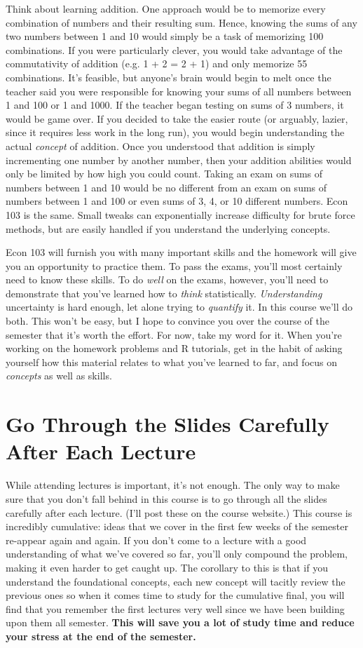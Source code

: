 \documentclass[12pt,letterpaper]{article}
\begin{document}
Think about learning addition. One approach would be to memorize every combination of numbers and their resulting sum. Hence, knowing the sums of any two numbers between 1 and 10 would simply be a task of memorizing 100 combinations. If you were particularly clever, you would take advantage of the commutativity of addition (e.g. 1 + 2 = 2 + 1) and only memorize 55 combinations. It's feasible, but anyone's brain would begin to melt once the teacher said you were responsible for knowing your sums of all numbers between 1 and 100 or 1 and 1000. If the teacher began testing on sums of 3 numbers, it would be game over. If you decided to take the easier route (or arguably, lazier, since it requires less work in the long run), you would begin understanding the actual \emph{concept} of addition. Once you understood that addition is simply incrementing one number by another number, then your addition abilities would only be limited by how high you could count. Taking an exam on sums of numbers between 1 and 10 would be no different from an exam on sums of numbers between 1 and 100 or even sums of 3, 4, or 10 different numbers. Econ 103 is the same. Small tweaks can exponentially increase difficulty for brute force methods, but are easily handled if you understand the underlying concepts.

Econ 103 will furnish you with many important skills and the homework will give you an opportunity to practice them. To pass the exams, you'll most certainly need to know these skills. To do \emph{well} on the exams, however, you'll need to demonstrate that you've learned how to \emph{think} statistically. \emph{Understanding} uncertainty is hard enough, let alone trying to \emph{quantify} it. In this course we'll do both. This won't be easy, but I hope to convince you over the course of the semester that it's worth the effort. For now, take my word for it. When you're working on the homework problems and R tutorials, get in the habit of asking yourself how this material relates to what you've learned to far, and focus on \emph{concepts} as well as skills.

\section{Go Through the Slides Carefully After Each Lecture}
While attending lectures is important, it's not enough. The only way to make sure that you don't fall behind in this course is to go through all the slides carefully after each lecture. (I'll post these on the course website.) This course is incredibly cumulative: ideas that we cover in the first few weeks of the semester re-appear again and again. If you don't come to a lecture with a good understanding of what we've covered so far, you'll only compound the problem, making it even harder to get caught up. The corollary to this is that if you understand the foundational concepts, each new concept will tacitly review the previous ones so when it comes time to study for the cumulative final, you will find that you remember the first lectures very well since we have been building upon them all semester. \textbf{This will save you a lot of study time and reduce your stress at the end of the semester.}
\end{document}
